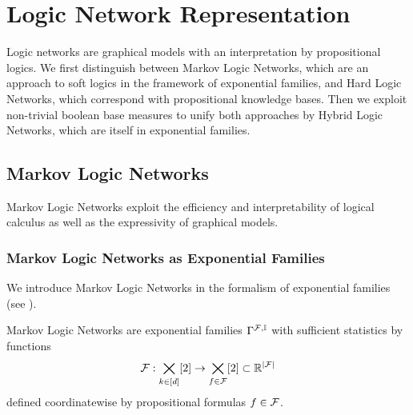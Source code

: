\section{Logic Network Representation}\label{cha:networkRepresentation}

Logic networks are graphical models with an interpretation by propositional logics.
We first distinguish between Markov Logic Networks, which are an approach to soft logics in the framework of exponential families, and Hard Logic Networks, which correspond with propositional knowledge bases.
Then we exploit non-trivial boolean base measures to unify both approaches by Hybrid Logic Networks, which are itself in exponential families.






\subsection{Markov Logic Networks}

Markov Logic Networks exploit the efficiency and interpretability of logical calculus as well as the expressivity of graphical models. 

\subsubsection{Markov Logic Networks as Exponential Families}

We introduce Markov Logic Networks in the formalism of exponential families (see ).

\begin{definition}
	Markov Logic Networks are exponential families $\Gamma^{\mathcal{F},\mathbb{I}}$ with sufficient statistics by functions
		\[ \mathcal{F} : \bigtimes_{k\in[d]}[2] \rightarrow \bigtimes_{f\in\mathcal{F}}[2] \subset \mathbb{R}^{\left|\mathcal{F}\right|} \]
	defined coordinatewise by propositional formulas $f\in\mathcal{F}$.
\end{definition}

